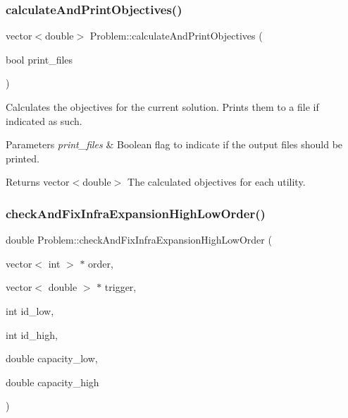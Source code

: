 \subsubsection{\texorpdfstring{calculate\+And\+Print\+Objectives()}{calculateAndPrintObjectives()}}
{\footnotesize\ttfamily vector$<$double$>$ Problem\+::calculate\+And\+Print\+Objectives (\begin{DoxyParamCaption}\item[{bool}]{print\+\_\+files }\end{DoxyParamCaption})}



Calculates the objectives for the current solution. Prints them to a file if indicated as such. 


\begin{DoxyParams}{Parameters}
{\em print\+\_\+files} & Boolean flag to indicate if the output files should be printed. \\
\hline
\end{DoxyParams}
\begin{DoxyReturn}{Returns}
vector$<$double$>$ The calculated objectives for each utility. 
\end{DoxyReturn}
\mbox{\label{classProblem_ab9750751c2d4468a3dfe5dd6573b5179}} 
\subsubsection{\texorpdfstring{check\+And\+Fix\+Infra\+Expansion\+High\+Low\+Order()}{checkAndFixInfraExpansionHighLowOrder()}}
{\footnotesize\ttfamily double Problem\+::check\+And\+Fix\+Infra\+Expansion\+High\+Low\+Order (\begin{DoxyParamCaption}\item[{vector$<$ int $>$ $\ast$}]{order,  }\item[{vector$<$ double $>$ $\ast$}]{trigger,  }\item[{int}]{id\+\_\+low,  }\item[{int}]{id\+\_\+high,  }\item[{double}]{capacity\+\_\+low,  }\item[{double}]{capacity\+\_\+high }\end{DoxyParamCaption})\hspace{0.3cm}{\ttfamily [protected]}}



